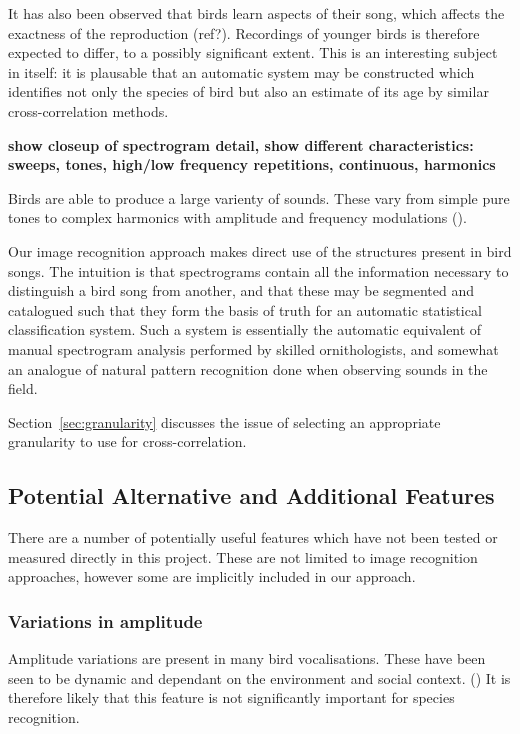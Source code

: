 It has also been observed that birds learn aspects of their song, which affects
the exactness of the reproduction (ref?).
Recordings of younger birds is therefore expected to differ, to a possibly
significant extent.
This is an interesting subject in itself: it is plausable that an automatic
system may be constructed which identifies not only the species of bird but also
an estimate of its age by similar cross-correlation methods.

\textbf{show closeup of spectrogram detail, show different characteristics:
sweeps, tones, high/low frequency repetitions, continuous, harmonics}

Birds are able to produce a large varienty of sounds.
These vary from simple pure tones to complex harmonics with amplitude and
frequency modulations (\textcite{fager2004}).

Our image recognition approach makes direct use of the structures present
in bird songs.
The intuition is that spectrograms contain all the information necessary to
distinguish a bird song from another, and that these may be segmented and
catalogued such that they form the basis of truth for an automatic statistical
classification system.
Such a system is essentially the automatic equivalent of manual spectrogram 
analysis performed by skilled ornithologists, and somewhat an analogue of natural
pattern recognition done when observing sounds in the field.

Section~\ref{sec:granularity} discusses the issue of selecting an appropriate
granularity to use for cross-correlation.

\subsection{Potential Alternative and Additional Features}
There are a number of potentially useful features which have not been tested or
measured directly in this project.
These are not limited to image recognition approaches, however some are
implicitly included in our approach.

\subsubsection{Variations in amplitude}
Amplitude variations are present in many bird vocalisations.
These have been seen to be dynamic and dependant on the environment and social
context. (\textcite{brumm2004})
It is therefore likely that this feature is not significantly important for
species recognition.


